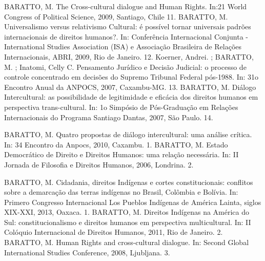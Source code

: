   \begin{cvhonors}
  \cvhonor
    {BARATTO, M.}
    {The Cross-cultural dialogue and Human Rights. In:21 World Congress of Political Science, 2009, Santiago, Chile}
    {}
    {11. }
  \cvhonor
    {BARATTO, M.}
    {Universalismo versus relativismo Cultural: é possível tornar universais padrões internacionais de direitos humanos?. In: Conferência Internacional Conjunta - International Studies Association (ISA) e Associação Brasileira de Relações Internacionais, ABRI, 2009, Rio de Janeiro.}
    {}
    {12. }
  \cvhonor
    {Koerner, Andrei. ; BARATTO, M. ; Inatomi, Celly C.}
    {Pensamento Jurídico e Decisão Judicial: o processo de controle
    concentrado em decisões do Supremo Tribunal Federal pós-1988. In: 31o Encontro Anual da ANPOCS, 2007, Caxambu-MG.}
    {}
    {13. }
  \cvhonor
    {BARATTO, M.}
    {Diálogo Intercultural: as possibilidade de legitimidade e eficácia dos direitos humanos em perspectiva trans-cultural. In: 1o Simpósio de Pós-Graduação em Relações Internacionais do Programa Santiago Dantas, 2007, São Paulo.}
    {}
    {14. }
\end{cvhonors}


\begin{cvhonors}
  \cvhonor
    {BARATTO, M.}
    {Quatro propostas de diálogo intercultural: uma análise crítica. In: 34 Encontro da Anpocs, 2010, Caxambu.}
    {}
    {1. }
  \cvhonor
    {BARATTO, M.}
  {Estado Democrático de Direito e Direitos Humanos: uma relação necessária. In: II Jornada de Filosofia e Direitos Humanos, 2006, Londrina.}
    {}
    {2. }
\end{cvhonors}


\begin{cvhonors}
  \cvhonor
    {BARATTO, M.}
    {Cidadania, direitos Indígenas e cortes constitucionais: conflitos sobre a demarcação das terras indígenas no Brasil, Colômbia e Bolívia. In: Primero Congresso Internacional Los Pueblos Indígenas de América Lainta, siglos XIX-XXI, 2013, Oaxaca.}
    {}
    {1. }
  \cvhonor
    {BARATTO, M.}
    {Direitos Indígenas na América do Sul: constitucionalismo e direitos humanos em perspectiva multicultural. In: II Colóquio Internacional de Direitos Humanos, 2011, Rio de Janeiro.}
    {}
    {2. }
  \cvhonor
    {BARATTO, M.}
    {Human Rights and cross-cultural dialogue. In: Second Global International Studies Conference, 2008, Ljubljana.}
    {}
    {3. }
\end{cvhonors}

